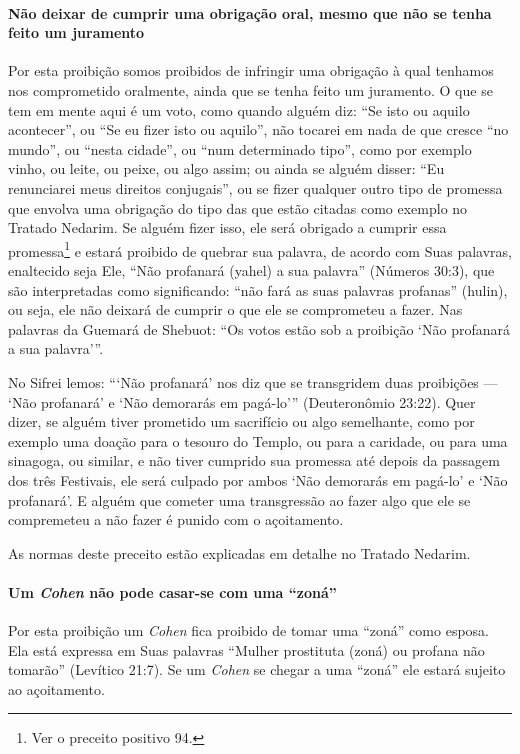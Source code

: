\paragraph{Não deixar de cumprir uma obrigação oral, mesmo que não se tenha
feito um juramento}

Por esta proibição somos proibidos de infringir uma obrigação à qual
tenhamos nos comprometido oralmente, ainda que se tenha feito um
juramento. O que se tem em mente aqui é um voto, como quando alguém
diz: ``Se isto ou aquilo acontecer'', ou ``Se eu fizer isto ou aquilo'',
não tocarei em nada de que cresce ``no mundo'', ou ``nesta cidade'', ou
``num determinado tipo'', como por exemplo vinho, ou leite, ou peixe, ou algo assim; ou ainda se alguém
disser: ``Eu renunciarei meus direitos conjugais'', ou se fizer
qualquer outro tipo de promessa que envolva uma obrigação do tipo das
que estão citadas como exemplo no Tratado Nedarim. Se alguém fizer isso,
ele será obrigado a cumprir essa promessa\footnote{Ver o preceito positivo 94.} e estará
proibido de quebrar sua palavra, de acordo com Suas palavras, enaltecido
seja Ele, ``Não profanará (yahel) a sua palavra'' (Números 30:3), que
são interpretadas como significando: ``não fará as suas palavras
profanas'' (hulin), ou seja, ele não deixará de cumprir o que ele se
comprometeu a fazer. Nas palavras da Guemará de Shebuot: ``Os votos
estão sob a proibição `Não profanará a sua palavra'''.

No Sifrei lemos: ```Não profanará' nos diz que se transgridem duas
proibições --- `Não profanará' e `Não demorarás em pagá-lo'''
(Deuteronômio 23:22). Quer dizer, se alguém tiver prometido um
sacrifício ou algo semelhante, como por exemplo uma doação para o
tesouro do Templo, ou para a caridade, ou para uma sinagoga, ou similar,
e não tiver cumprido sua promessa até depois da passagem dos três
Festivais, ele será culpado por ambos `Não demorarás em pagá-lo' e `Não
profanará'. E alguém que cometer uma transgressão ao fazer algo que ele
se compremeteu a não fazer é punido com o açoitamento.

As normas deste preceito estão explicadas em detalhe no Tratado Nedarim.

\paragraph{Um \textit{Cohen} não pode casar-se com uma ``zoná''}

Por esta proibição um \textit{Cohen} fica proibido de tomar uma ``zoná'' como
esposa. Ela está expressa em Suas palavras ``Mulher prostituta (zoná) ou
profana não tomarão'' (Levítico 21:7). Se um \textit{Cohen} se chegar a uma
``zoná'' ele estará sujeito ao açoitamento.

